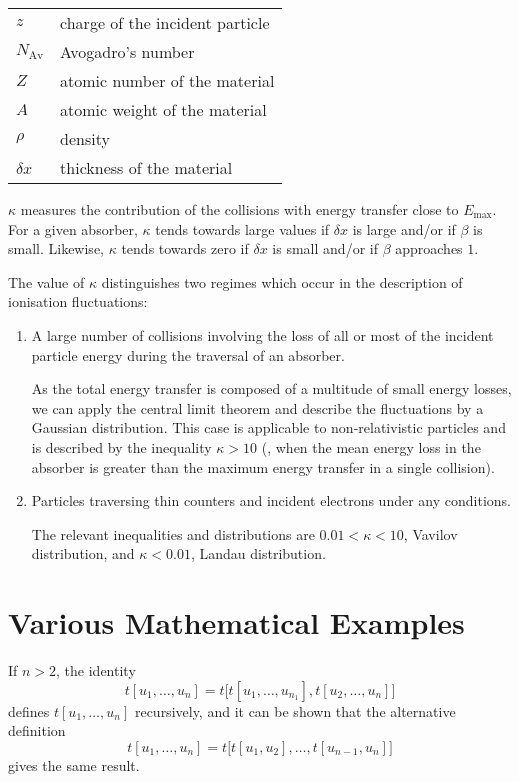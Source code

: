 \begin{tabular}{ll}
$z$          & charge of the incident particle \\
$N_{\textrm{Av}}$     & Avogadro's number \\
$Z$          & atomic number of the material \\
$A$          & atomic weight of the material \\
$\rho$       & density \\
$ \delta x$  & thickness of the material \\
\end{tabular}

$\kappa$ measures the contribution of the collisions with energy
transfer close to $E_{\textrm{max}}$.  For a given absorber, $\kappa$
tends
towards large values if $\delta x$ is large and/or if $\beta$ is
small.  Likewise, $\kappa$ tends towards zero if $\delta x $ is small
and/or if $\beta$ approaches $1$.

The value of $\kappa$ distinguishes two regimes which occur in the
description of ionisation fluctuations:

\begin{enumerate}
\item A large number of collisions involving the loss of all or most
    of the incident particle energy during the traversal of an absorber.

    As the total energy transfer is composed of a multitude of small
    energy losses, we can apply the central limit theorem and describe
    the fluctuations by a Gaussian distribution.  This case is
    applicable to non-relativistic particles and is described by the
    inequality $\kappa > 10 $ (\ie, when the mean energy loss in the
    absorber is greater than the maximum energy transfer in a single
    collision).

\item Particles traversing thin counters and incident electrons under
    any conditions.

    The relevant inequalities and distributions are $ 0.01 < \kappa < 10
    $,
    Vavilov distribution, and $\kappa < 0.01 $, Landau distribution.
\end{enumerate}


\section{Various Mathematical Examples}
If $n > 2$, the identity
\[
    t[u_1,\dots,u_n] = t\bigl[t[u_1,\dots,u_{n_1}], t[u_2,\dots,u_n]
    \bigr]
\]
defines $t[u_1,\dots,u_n]$ recursively, and it can be shown that the
alternative definition
\[
    t[u_1,\dots,u_n] = t\bigl[t[u_1,u_2],\dots,t[u_{n-1},u_n]\bigr]
\]
gives the same result.

